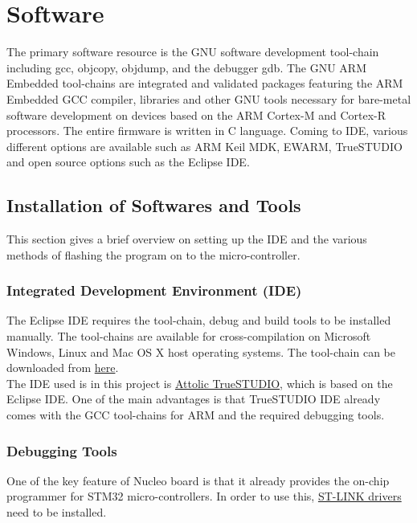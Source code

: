 \documentclass[a4paper,12pt,oneside]{book}
\begin{document}
\chapter[Software]{Software}
The primary software resource is the GNU software development tool-chain including gcc, objcopy, objdump, and the debugger gdb. The GNU ARM Embedded tool-chains are integrated and validated packages featuring the ARM Embedded GCC compiler, libraries and other GNU tools necessary for bare-metal software development on devices based on the ARM Cortex-M and Cortex-R processors.\cite{geob, gnu} The entire firmware is written in C language. Coming to IDE, various different options are available such as ARM Keil MDK, EWARM, TrueSTUDIO and open source options such as the Eclipse IDE.

\section{Installation of Softwares and Tools}
This section gives a brief overview on setting up the IDE and the various methods of flashing the program on to the micro-controller.

\subsection{Integrated Development Environment (IDE)}
The Eclipse IDE requires the tool-chain, debug and build tools to be installed manually. The tool-chains are available for cross-compilation on Microsoft Windows, Linux and Mac OS X host operating systems. The tool-chain can be downloaded from \href{https://launchpad.net/gcc-arm-embedded/}{here}.\cite{gnu}\\

The IDE used is in this project is \href{https://atollic.com/resources/download/}{Attolic TrueSTUDIO}, which is based on the Eclipse IDE. One of the main advantages is that TrueSTUDIO IDE already comes with the GCC tool-chains for ARM and the required debugging tools.\\ 

\subsection{Debugging Tools}
\label{ssec:stmdebug}
One of the key feature of Nucleo board is that it already provides the on-chip programmer for STM32 micro-controllers. In order to use this, \href{http://www.st.com/en/embedded-software/stsw-link009.html}{ST-LINK drivers} need to be installed.\\
\end{document}
